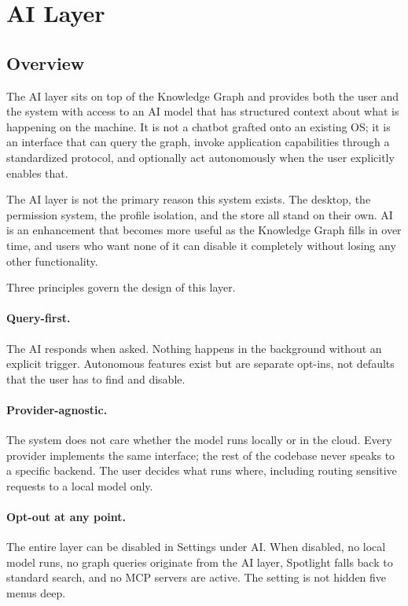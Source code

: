 \section{AI Layer}
\label{sec:ai}

\subsection{Overview}
\label{sec:ai-overview}

The AI layer sits on top of the Knowledge Graph and provides both the user and
the system with access to an AI model that has structured context about what is
happening on the machine. It is not a chatbot grafted onto an existing OS; it
is an interface that can query the graph, invoke application capabilities
through a standardized protocol, and optionally act autonomously when the user
explicitly enables that.

The AI layer is not the primary reason this system exists. The desktop, the
permission system, the profile isolation, and the store all stand on their own.
AI is an enhancement that becomes more useful as the Knowledge Graph fills in
over time, and users who want none of it can disable it completely without
losing any other functionality.

Three principles govern the design of this layer.

\paragraph{Query-first.}
The AI responds when asked. Nothing happens in the background without an
explicit trigger. Autonomous features exist but are separate opt-ins, not
defaults that the user has to find and disable.

\paragraph{Provider-agnostic.}
The system does not care whether the model runs locally or in the cloud.
Every provider implements the same interface; the rest of the codebase never
speaks to a specific backend. The user decides what runs where, including
routing sensitive requests to a local model only.

\paragraph{Opt-out at any point.}
The entire layer can be disabled in Settings under AI. When disabled, no local
model runs, no graph queries originate from the AI layer, Spotlight falls back
to standard search, and no MCP servers are active. The setting is not hidden
five menus deep.

